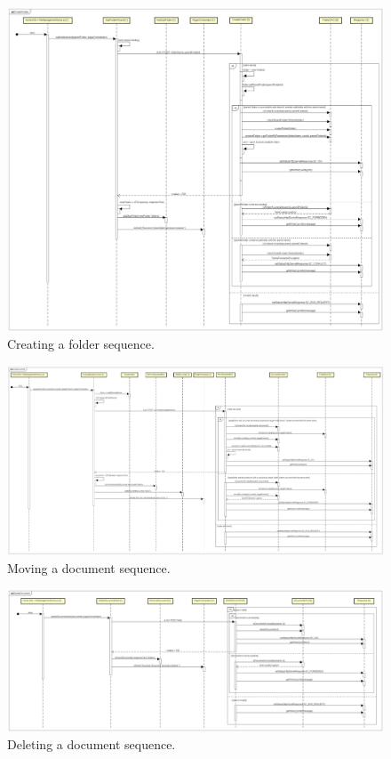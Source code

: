 \documentclass[a4paper,12pt]{article}
\begin{document}
\begin{figure}[H]
    \centering
     \includegraphics[width=1.0\textwidth]{JS/SequenceDiagram/CreateFolder.png}
    \caption{Creating a folder sequence.}
\end{figure}
        
\begin{figure}[H]
    \centering
     \includegraphics[width=1.0\textwidth]{JS/SequenceDiagram/MoveDocument.png}
    \caption{Moving a document sequence.}
\end{figure}
    
\begin{figure}[H]
    \centering
     \includegraphics[width=1.0\textwidth]{JS/SequenceDiagram/DeleteDocument.png}
    \caption{Deleting a document sequence.}
\end{figure}    
\end{document}
